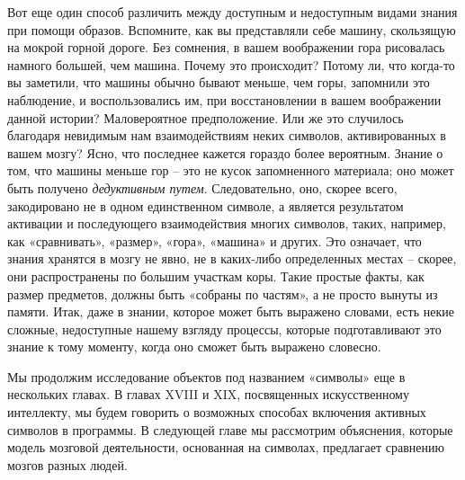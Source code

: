 \documentclass[../main.tex]{subfiles}
\begin{document}
Вот еще один способ различить между доступным и недоступным видами знания при помощи образов. Вспомните, как вы представляли себе машину, скользящую на мокрой горной дороге. Без сомнения, в вашем воображении гора рисовалась намного большей, чем машина. Почему это происходит? Потому ли, что когда-то вы заметили, что машины обычно бывают меньше, чем горы, запомнили это наблюдение, и воспользовались им, при восстановлении в вашем воображении данной истории? Маловероятное предположение. Или же это случилось благодаря невидимым нам взаимодействиям неких символов, активированных в вашем мозгу? Ясно, что последнее кажется гораздо более вероятным. Знание о том, что машины меньше гор \--- это не кусок запомненного материала; оно может быть получено \emph{дедуктивным путем}. Следовательно, оно, скорее всего, закодировано не в одном единственном символе, а является результатом активации и последующего взаимодействия многих символов, таких, например, как «сравнивать», «размер», «гора», «машина» и других. Это означает, что знания хранятся в мозгу не явно, не в каких-либо определенных местах \--- скорее, они распространены по большим участкам коры. Такие простые факты, как размер предметов, должны быть «собраны по частям», а не просто вынуты из памяти. Итак, даже в знании, которое может быть выражено словами, есть некие сложные, недоступные нашему взгляду процессы, которые подготавливают это знание к тому моменту, когда оно сможет быть выражено словесно.

Мы продолжим исследование объектов под названием «символы» еще в нескольких главах. В главах XVIII и XIX, посвященных искусственному интеллекту, мы будем говорить о возможных способах включения активных символов в программы. В следующей главе мы рассмотрим объяснения, которые модель мозговой деятельности, основанная на символах, предлагает сравнению мозгов разных людей.
\end{document}
